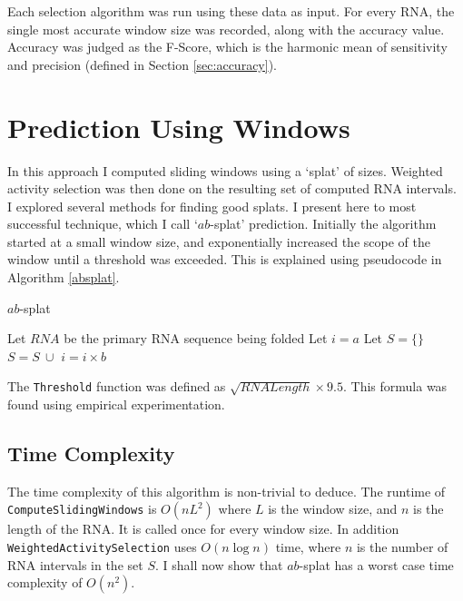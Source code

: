 \documentclass{cshonours}
\begin{document}
Each selection algorithm was run using these data as input. For every RNA, the single most accurate window size was recorded, along with the accuracy value. Accuracy was judged as the F-Score, which is the harmonic mean of sensitivity and precision (defined in Section \ref{sec:accuracy}).




\section{Prediction Using Windows}
In this approach I computed sliding windows using a `splat' of sizes. Weighted activity selection was then done on the resulting set of computed RNA intervals. I explored several methods for finding good splats. I present here to most successful technique, which I call `$ab$-splat' prediction. Initially the algorithm started at a small window size, and exponentially increased the scope of the window until a threshold was exceeded. This is explained using pseudocode in Algorithm \ref{absplat}.

\begin{algorithm}
  \caption{$ab$-splat}
  \label{absplat}
  \begin{algorithmic}[1]
  \State Let $RNA$ be the primary RNA sequence being folded
  \State Let $i = a$
  \State Let $S = \{\}$
  	\State $S = S \: \cup $ 
  	\State $i = i \times b$
  \EndWhile
  \State \Return {}
  \end{algorithmic}
\end{algorithm}

The \texttt{Threshold} function was defined as $\sqrt{RNALength} \times 9.5$. This formula was found using empirical experimentation.

\subsection{Time Complexity}

The time complexity of this algorithm is non-trivial to deduce. The runtime of \texttt{ComputeSlidingWindows} is $O(nL^2)$ where $L$ is the window size, and $n$ is the length of the RNA. It is called once for every window size. In addition \texttt{WeightedActivitySelection} uses $O(n \log n)$ time, where $n$ is the number of RNA intervals in the set $S$. I shall now show that $ab$-splat has a worst case time complexity of $O(n^2)$.
\end{document}
